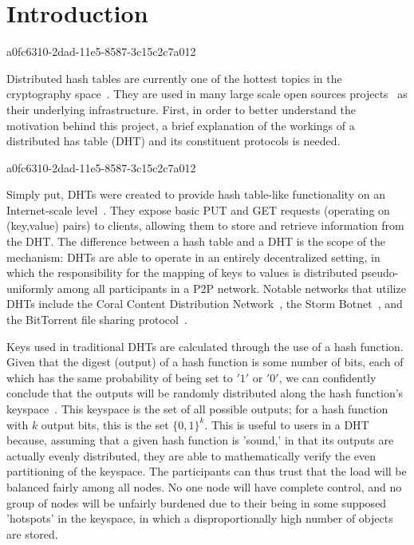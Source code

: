 \documentclass[12pt]{article}
\begin{document}
\section{Introduction}
a0fc6310-2dad-11e5-8587-3c15c2c7a012\par Distributed hash tables are currently one of the hottest topics in the cryptography space~\cite{Stoica:2001dj,Rowstron:2001ea,Ratnasamy:2001wn}. They are used in many large scale open sources projects~\cite{Freitas:2013tb,Xu:2010vs,Perfitt:2010fh} as their underlying infrastructure. First, in order to better understand the motivation behind this project, a brief explanation of the workings of a distributed has table (DHT) and its constituent protocols is needed.

a0fc6310-2dad-11e5-8587-3c15c2c7a012\par Simply put, DHTs were created to provide hash table-like functionality on an Internet-scale level~\cite{Ratnasamy:2001wn}. They expose basic PUT and GET requests (operating on (key,value) pairs) to clients, allowing them to store and retrieve information from the DHT. The difference between a hash table and a DHT is the scope of the mechanism: DHTs are able to operate in an entirely decentralized setting, in which the responsibility for the mapping of keys to values is distributed pseudo-uniformly among all participants in a P2P network. Notable networks that utilize DHTs include the Coral Content Distribution Network~\cite{Freedman:2004vb}, the Storm Botnet~\cite{Holz:2008uk}, and the BitTorrent file sharing protocol~\cite{Cohen:y1_8mBnw}.

\par Keys used in traditional DHTs are calculated through the use of a hash function. Given that the digest (output) of a hash function is some number of bits, each of which has the same probability of being set to $'1'$ or $'0'$, we can confidently conclude that the outputs will be randomly distributed along the hash function's keyspace~. This keyspace is the set of all possible outputs; for a hash function with $k$ output bits, this is the set $\{0,1\}^k$. This is useful to users in a DHT because, assuming that a given hash function is 'sound,' in that its outputs are actually evenly distributed, they are able to mathematically verify the even partitioning of the keyspace. The participants can thus trust that the load will be balanced fairly among all nodes. No one node will have complete control, and no group of nodes will be unfairly burdened due to their being in some supposed 'hotspots' in the keyspace, in which a disproportionally high number of objects are stored.~
\end{document}
